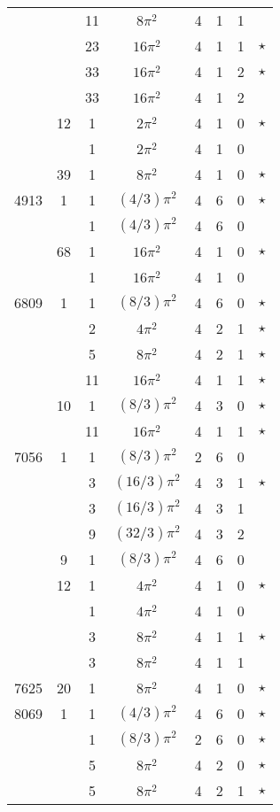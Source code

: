 \begin{tabular}{ccc|ccccc}
 &  & 11 & $8\pi^2$ & 4 & 1 & 1 &  \\
 &  & 23 & $16\pi^2$ & 4 & 1 & 1 & $\star$ \\
 &  & 33 & $16\pi^2$ & 4 & 1 & 2 & $\star$ \\
 &  & 33 & $16\pi^2$ & 4 & 1 & 2 &  \\
 & 12 & 1 & $2\pi^2$ & 4 & 1 & 0 & $\star$ \\
 &  & 1 & $2\pi^2$ & 4 & 1 & 0 &  \\
 & 39 & 1 & $8\pi^2$ & 4 & 1 & 0 & $\star$ \\
4913 & 1 & 1 & $(4/3)\pi^2$ & 4 & 6 & 0 & $\star$ \\
 &  & 1 & $(4/3)\pi^2$ & 4 & 6 & 0 &  \\
 & 68 & 1 & $16\pi^2$ & 4 & 1 & 0 & $\star$ \\
 &  & 1 & $16\pi^2$ & 4 & 1 & 0 &  \\
6809 & 1 & 1 & $(8/3)\pi^2$ & 4 & 6 & 0 & $\star$ \\
 &  & 2 & $4\pi^2$ & 4 & 2 & 1 & $\star$ \\
 &  & 5 & $8\pi^2$ & 4 & 2 & 1 & $\star$ \\
 &  & 11 & $16\pi^2$ & 4 & 1 & 1 & $\star$ \\
 & 10 & 1 & $(8/3)\pi^2$ & 4 & 3 & 0 & $\star$ \\
 &  & 11 & $16\pi^2$ & 4 & 1 & 1 & $\star$ \\
7056 & 1 & 1 & $(8/3)\pi^2$ & 2 & 6 & 0 &  \\
 &  & 3 & $(16/3)\pi^2$ & 4 & 3 & 1 & $\star$ \\
 &  & 3 & $(16/3)\pi^2$ & 4 & 3 & 1 &  \\
 &  & 9 & $(32/3)\pi^2$ & 4 & 3 & 2 &  \\
 & 9 & 1 & $(8/3)\pi^2$ & 4 & 6 & 0 &  \\
 & 12 & 1 & $4\pi^2$ & 4 & 1 & 0 & $\star$ \\
 &  & 1 & $4\pi^2$ & 4 & 1 & 0 &  \\
 &  & 3 & $8\pi^2$ & 4 & 1 & 1 & $\star$ \\
 &  & 3 & $8\pi^2$ & 4 & 1 & 1 &  \\
7625 & 20 & 1 & $8\pi^2$ & 4 & 1 & 0 & $\star$ \\
8069 & 1 & 1 & $(4/3)\pi^2$ & 4 & 6 & 0 & $\star$ \\
 &  & 1 & $(8/3)\pi^2$ & 2 & 6 & 0 & $\star$ \\
 &  & 5 & $8\pi^2$ & 4 & 2 & 0 & $\star$ \\
 &  & 5 & $8\pi^2$ & 4 & 2 & 1 & $\star$ \\

\end{tabular}
